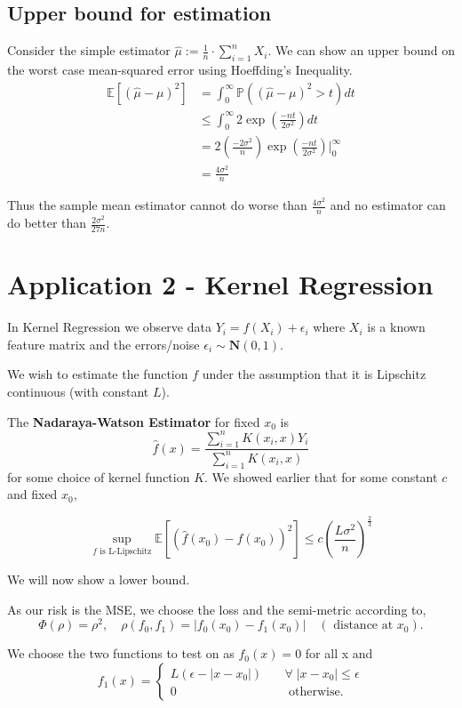 \documentclass{article}
\newcommand{\Ev}{\mathbb{E}}
\begin{document}
	\subsection{Upper bound for estimation}
	Consider the simple estimator $\hat{\mu} := \frac{1}{n}\cdot \sum_{i=1}^n X_i$. We can show an upper bound on the worst case mean-squared error using Hoeffding's Inequality. 
	\begin{align*}
	\Ev [(\hat{\mu}-\mu)^2] &= \int_0^\infty \mathbb{P}\left((\hat{\mu} - \mu)^2 > t \right) dt \\
	& \leq \int_0^\infty 2 \exp\left(\frac{-nt}{2\sigma^2}\right) dt \\
	& = 2 \left(\frac{-2\sigma^2}{n}\right)  \exp \left(\frac{-nt}{2\sigma^2}\right) \bigg\rvert_0^{\infty}\\
	&= \frac{4\sigma^2}{n}
	\end{align*}
	
	Thus the sample mean estimator cannot do worse than $\frac{4\sigma^2}{n}$ and no estimator can do better than $\frac{2\sigma^2}{27n}$. 
	
	\section{Application 2 - Kernel Regression}
	In Kernel Regression we observe data $Y_i = f(X_i) + \epsilon_i$ where $X_i$ is a known feature matrix and the errors/noise $\epsilon_i \sim \mathbf{N}(0,1)$. 
	
	We wish to estimate the function $f$ under the assumption that it is Lipschitz continuous (with constant $L$). 
	
	
	The \textbf{Nadaraya-Watson
		Estimator} for fixed $x_0$ is
	\[ 
	\hat{f}(x) = \frac{
		\sum_{i=1}^n K(x_i,x)Y_i}{
		\sum_{i=1}^n K(x_i,x)}
	\]
	for some choice of kernel function $K$. We showed earlier that for some constant $c$ and fixed $x_0$,
	
	\[ \sup_{f \text{ is L-Lipschitz}} \Ev \left[ (\hat{f}(x_0) - f(x_0))^2 \right] \leq c\left(\frac{L\sigma^2}{n}\right)^{\frac{2}{3}}\]
	
	We will now show a lower bound. 
	
	As our risk is the MSE, we choose the loss and the semi-metric according to, 
	\[
	\Phi(\rho) = \rho^2, \quad \rho(f_0,f_1) = |f_0(x_0) - f_1(x_0)| \quad (\text{ distance at } x_0).
	\]
	
	We choose the two functions to test on as $f_0(x) = 0$ for all x and 
	\[f_1(x) = \begin{cases}
	L(\epsilon - |x - x_0|) &\quad \forall \; |x- x_0| \leq \epsilon \\
	0 &\quad \text{ otherwise}. 
	\end{cases}
	\]
	
\end{document}
